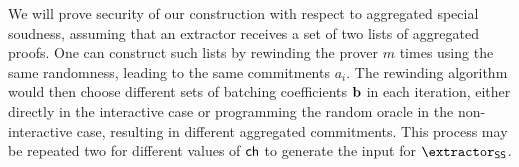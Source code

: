 \begin{remark}
    We will prove security of our construction with respect to aggregated special soudness, assuming that an extractor receives a set of two lists of aggregated proofs. One can construct such lists by rewinding the prover $m$ times using the same randomness, leading to the same commitments $a_i$. The rewinding algorithm would then choose different sets of batching coefficients $\mathbf{b}$ in each iteration, either directly in the interactive case or programming the random oracle in the non-interactive case, resulting in different aggregated commitments. This process may be repeated two for different values of $\mathsf{ch}$ to generate the input for $\extractor_\textsf{SS}$.
\end{remark}